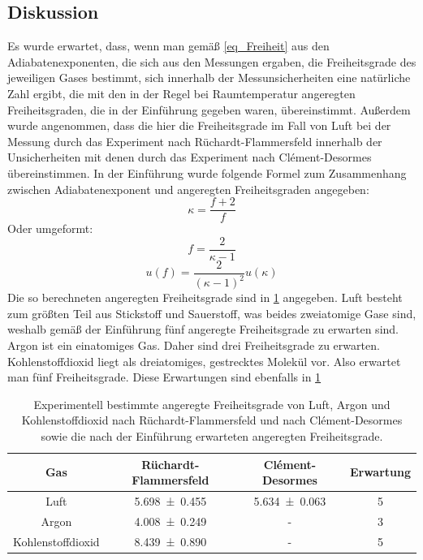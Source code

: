\documentclass[
	a4paper,
	12pt,
	pagesize,
	ngerman
]{scrartcl}
\begin{document}
	\subsection{Diskussion}
	
	Es wurde erwartet, dass, wenn man gemäß \cref{eq_Freiheit} aus den Adiabatenexponenten, die sich aus den Messungen ergaben, die Freiheitsgrade des jeweiligen Gases bestimmt, sich innerhalb der Messunsicherheiten eine natürliche Zahl ergibt, die mit den in der Regel bei Raumtemperatur angeregten Freiheitsgraden, die in der Einführung gegeben waren, übereinstimmt. %
	Außerdem wurde angenommen, dass die hier die Freiheitsgrade im Fall von Luft bei der Messung durch das Experiment nach Rüchardt-Flammersfeld innerhalb der Unsicherheiten mit denen durch das Experiment nach Clément-Desormes übereinstimmen.
	In der Einführung wurde folgende Formel zum Zusammenhang zwischen Adiabatenexponent und angeregten Freiheitsgraden angegeben:
	\begin{equation}
		\kappa = \frac{f+2}{f}
	\end{equation}
	Oder umgeformt:
	\begin{equation}
		f = \frac{2}{\kappa -1}
		\label{eq_Freiheit}
	\end{equation}
	\begin{equation}
	u(f) = \frac{2}{(\kappa -1)^2} u(\kappa) 
	\end{equation}
	Die so berechneten angeregten Freiheitsgrade sind in \cref{tab_Freiheit} angegeben.
	Luft besteht zum größten Teil aus Stickstoff und Sauerstoff, was beides zweiatomige Gase sind, weshalb gemäß der Einführung fünf angeregte Freiheitsgrade zu erwarten sind.
	Argon ist ein einatomiges Gas. %
	Daher sind drei Freiheitsgrade zu erwarten.
	Kohlenstoffdioxid liegt als dreiatomiges, gestrecktes Molekül vor.
	Also erwartet man fünf Freiheitsgrade.
	Diese Erwartungen sind ebenfalls in \cref{tab_Freiheit}
	\begin{table}[H]
		\centering
		\begin{tabular}{ c | c | c | c }
			Gas & Rüchardt-Flammersfeld  & Clément-Desormes & Erwartung \\ \hline
			Luft & \SI{5,698 \pm 0,455}{} & \SI{5,634 \pm 0,063}{} & 5\\
			Argon & \SI{4,008 \pm 0,249}{} & - & 3\\
			Kohlenstoffdioxid & \SI{8,439 \pm 0,890}{} & - & 5\\
		\end{tabular}
		\caption{Experimentell bestimmte angeregte Freiheitsgrade von Luft, Argon und Kohlenstoffdioxid nach Rüchardt-Flammersfeld und nach Clément-Desormes sowie die nach der Einführung erwarteten angeregten Freiheitsgrade.}
		\label{tab_Freiheit}
	
	
	\end{table}
	
\end{document}

